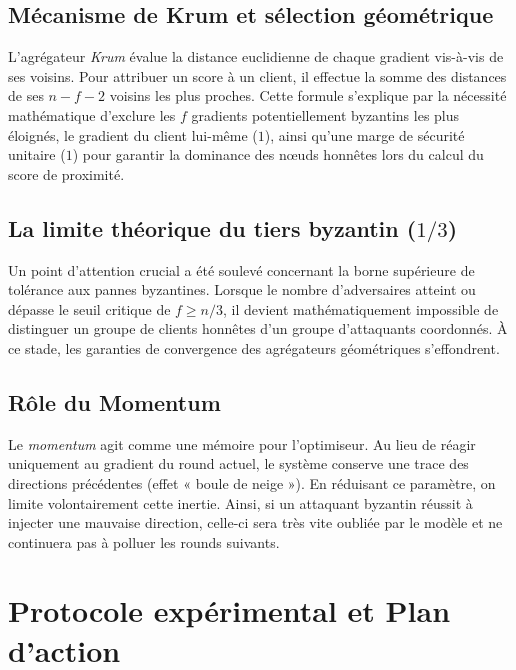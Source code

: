 \documentclass[11pt, a4paper]{article}
\begin{document}
\subsection{Mécanisme de Krum et sélection géométrique}
L'agrégateur \textit{Krum} évalue la distance euclidienne de chaque gradient vis-à-vis de ses voisins. Pour attribuer un score à un client, il effectue la somme des distances de ses $n-f-2$ voisins les plus proches. 
Cette formule s'explique par la nécessité mathématique d'exclure les $f$ gradients potentiellement byzantins les plus éloignés, le gradient du client lui-même ($1$), ainsi qu'une marge de sécurité unitaire ($1$) pour garantir la dominance des nœuds honnêtes lors du calcul du score de proximité.

\subsection{La limite théorique du tiers byzantin ($1/3$)}
Un point d'attention crucial a été soulevé concernant la borne supérieure de tolérance aux pannes byzantines. Lorsque le nombre d'adversaires atteint ou dépasse le seuil critique de $f \ge n/3$, il devient mathématiquement impossible de distinguer un groupe de clients honnêtes d'un groupe d'attaquants coordonnés. À ce stade, les garanties de convergence des agrégateurs géométriques s'effondrent.

\subsection{Rôle du Momentum}
Le \textit{momentum} agit comme une mémoire pour l'optimiseur. Au lieu de réagir uniquement au gradient du round actuel, le système conserve une trace des directions précédentes (effet « boule de neige »). En réduisant ce paramètre, on limite volontairement cette inertie. Ainsi, si un attaquant byzantin réussit à injecter une mauvaise direction, celle-ci sera très vite oubliée par le modèle et ne continuera pas à polluer les rounds suivants.

\section{Protocole expérimental et Plan d'action}
\end{document}
